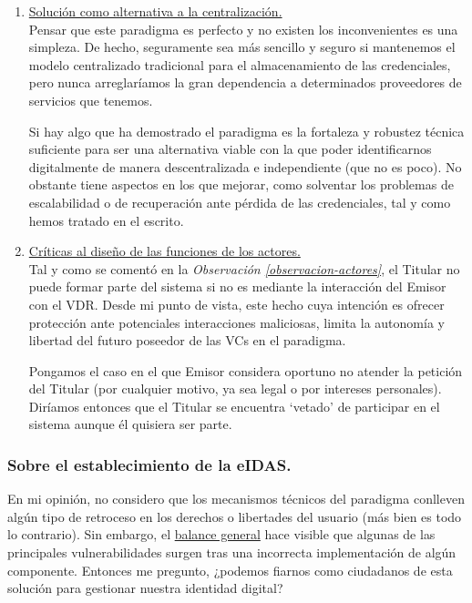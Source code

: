 \documentclass[../main.tex]{subfiles}
\begin{document}
\begin{enumerate}
    \item \underline{Solución como alternativa a la centralización.}
    \\ Pensar que este paradigma es perfecto y no existen los inconvenientes es una simpleza. De hecho, seguramente sea más sencillo y seguro si mantenemos el modelo centralizado tradicional para el almacenamiento de las credenciales, pero nunca arreglaríamos la gran dependencia a determinados proveedores de servicios que tenemos.

    Si hay algo que ha demostrado el paradigma es la fortaleza y robustez técnica suficiente para ser una alternativa viable con la que poder identificarnos digitalmente de manera descentralizada e independiente (que no es poco). No obstante tiene aspectos en los que mejorar, como solventar los problemas de escalabilidad o de recuperación ante pérdida de las credenciales, tal y como hemos tratado en el escrito.
    \\
    
    \item \underline{Críticas al diseño de las funciones de los actores.}
    \\ Tal y como se comentó en la \textit{Observación \ref{observacion-actores}}, el Titular no puede formar parte del sistema si no es mediante la interacción del Emisor con el \acrshort{VDR}. Desde mi punto de vista, este hecho cuya intención es ofrecer protección ante potenciales interacciones maliciosas, limita la autonomía y libertad del futuro poseedor de las \acrshort{VC}s en el paradigma. 
    
    Pongamos el caso en el que Emisor considera oportuno no atender la petición del Titular (por cualquier motivo, ya sea legal o por intereses personales). Diríamos entonces que el Titular se encuentra `vetado' de participar en el sistema aunque él quisiera ser parte.
    \\

\end{enumerate}


\subsubsection{Sobre el establecimiento de la \acrlong{eIDAS}.}
En mi opinión, no considero que los mecanismos técnicos del paradigma conlleven algún tipo de retroceso en los derechos o libertades del usuario (más bien es todo lo contrario). Sin embargo, el \hyperref[Balance general y tabla resumen]{balance general} hace visible que algunas de las principales vulnerabilidades surgen tras una incorrecta implementación de algún componente. Entonces me pregunto, ¿podemos fiarnos como ciudadanos de esta solución para gestionar nuestra identidad digital?
\\
\end{document}
